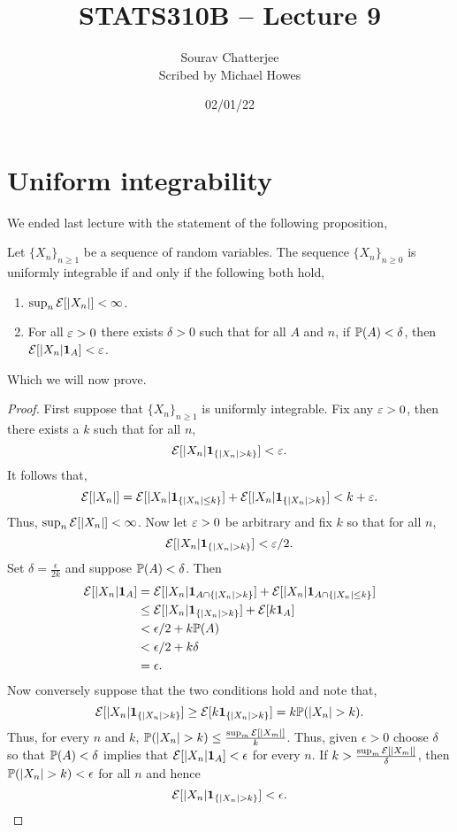 




\title{STATS310B -- Lecture 9}
\author{Sourav Chatterjee\\ Scribed by Michael Howes}
\date{02/01/22}

\pagestyle{fancy}
\fancyhf{}


\maketitle
\tableofcontents
\section{Uniform integrability}
We ended last lecture with the statement of the following proposition,
\begin{proposition}\label{charactrized}
    Let $\{X_n\}_{n \ge 1}$ be a sequence of random variables. The sequence $\{X_n\}_{n \ge 0}$ is uniformly integrable if and only if the following both hold,
    \begin{enumerate}
        \item $\sup_n {\mathcal{E}}[{\left\lvert X_n\right\rvert}] < \infty$.
        \item For all $\varepsilon >0$ there exists $\delta > 0$ such that for all $A$ and $n$, if ${\mathbb{P}}(A) <\delta$, then ${\mathcal{E}}[{\left\lvert X_n\right\rvert}{{\bf 1}}_A] < \varepsilon$.
    \end{enumerate}
\end{proposition}
Which we will now prove.
\begin{proof}
    First suppose that $\{X_n\}_{n \ge 1}$ is uniformly integrable. Fix any $\varepsilon > 0$, then there exists a $k$ such that for all $n$,
    \[{\mathcal{E}}[{\left\lvert X_n\right\rvert}{{\bf 1}}_{\{{\left\lvert X_n\right\rvert}>k\}}] < \varepsilon. \]
    It follows that,
    \[{\mathcal{E}}[{\left\lvert X_n\right\rvert}] ={\mathcal{E}}[{\left\lvert X_n\right\rvert}{{\bf 1}}_{\{{\left\lvert X_n\right\rvert}\le k\}}]+{\mathcal{E}}[{\left\lvert X_n\right\rvert}{{\bf 1}}_{\{{\left\lvert X_n\right\rvert}>k\}}]<k+\varepsilon. \]
    Thus, $\sup_n {\mathcal{E}}[{\left\lvert X_n\right\rvert}] < \infty$. Now let $\varepsilon >0$ be arbitrary and fix $k$ so that for all $n$,
    \[{\mathcal{E}}[{\left\lvert X_n\right\rvert}{{\bf 1}}_{\{{\left\lvert X_n\right\rvert}>k\}}] < \varepsilon/2.\]
    Set $\delta = \frac{\epsilon}{2k}$ and suppose ${\mathbb{P}}(A)<\delta$. Then
    \begin{align*}
        {\mathcal{E}}[{\left\lvert X_n\right\rvert}{{\bf 1}}_A]&={\mathcal{E}}[{\left\lvert X_n\right\rvert}{{\bf 1}}_{A\cap\{{\left\lvert X_n\right\rvert}> k\}}]+{\mathcal{E}}[{\left\lvert X_n\right\rvert}{{\bf 1}}_{A\cap\{{\left\lvert X_n\right\rvert}\le k\}}]\\
        &\le {\mathcal{E}}[{\left\lvert X_n\right\rvert}{{\bf 1}}_{\{{\left\lvert X_n\right\rvert}>k\}}]+{\mathcal{E}}[k{{\bf 1}}_A]\\
        &< \epsilon/2 + k{\mathbb{P}}(A)\\
        &<\epsilon/2+k\delta\\
        &=\epsilon.
    \end{align*}
    Now conversely suppose that the two conditions hold and note that, 
    \[{\mathcal{E}}[{\left\lvert X_n\right\rvert}{{\bf 1}}_{\{{\left\lvert X_n\right\rvert}>k\}}] \ge {\mathcal{E}}[k{{\bf 1}}_{\{{\left\lvert X_n\right\rvert}>k\}}]=k{\mathbb{P}}({\left\lvert X_n\right\rvert}>k). \]
    Thus, for every $n$ and $k$, ${\mathbb{P}}({\left\lvert X_n\right\rvert} > k)\le \frac{\sup_m {\mathcal{E}}[{\left\lvert X_m\right\rvert}]}{k}$. Thus, given $\epsilon >0$ choose $\delta$ so that ${\mathbb{P}}(A)<\delta$ implies that ${\mathcal{E}}[{\left\lvert X_n\right\rvert}{{\bf 1}}_A]<\epsilon$ for every $n$. If $k > \frac{\sup_m {\mathcal{E}}[{\left\lvert X_m\right\rvert}]}{\delta}$, then ${\mathbb{P}}({\left\lvert X_n\right\rvert} > k) < \epsilon$ for all $n$ and hence
    \[{\mathcal{E}}[{\left\lvert X_n\right\rvert}{{\bf 1}}_{\{{\left\lvert X_n\right\rvert}>k\}}] < \epsilon.\qedhere \]
\end{proof}
